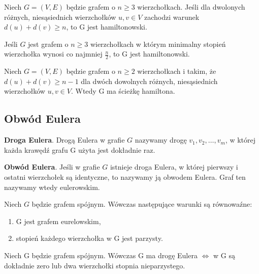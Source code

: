 \documentclass[12pt]{article}
\begin{document}
    \begin{theorem}
        Niech $G = (V, E)$ będzie grafem o $n \geq 3$ wierzchołkach. Jeśli dla dwolonych różnych, niesąsiednich
        wierzchołków $u, v \in V$ zachodzi warunek $d(u) + d(v) \geq n$, to G jest hamiltonowski.
    \end{theorem}

    \begin{theorem}
        Jeśli $G$ jest grafem o $n \geq 3$ wierzchołkach w którym minimalny stopień wierzchołka wynosi co najmniej
        $\frac{n}{2}$, to G jest hamiltonowski.
    \end{theorem}

    \begin{theorem}
        Niech $G = (V, E)$ będzie grafem o $n \geq 2$ wierzchołkach i takim, że $d(u) + d(v) \geq n-1$ dla dwóch dowolnych
        różnych, niesąsiednich wierzchołków $u, v \in V$. Wtedy G ma ścieżkę hamiltona.
    \end{theorem}

    \subsection{Obwód Eulera}
    \begin{definition}
        \textbf{Droga Eulera}. Drogą Eulera w grafie $G$ nazywamy drogę $v_1, v_2, \dots, v_m$, w której każda krawędź grafu G użyta
        jest dokładnie raz.
    \end{definition}
    \begin{definition}
        \textbf{Obwód Eulera}. Jeśli w grafie $G$ istnieje droga Eulera, w której pierwszy i ostatni wierzchołek są identyczne, to nazywamy ją
        obwodem Eulera. Graf ten nazywamy wtedy eulerowskim.
    \end{definition}

    \begin{theorem}
        Niech $G$ będzie grafem spójnym. Wówczas następujące warunki są równowaźne:
        \begin{enumerate}
            \item G jest grafem eurelowskim,
            \item stopień każdego wierzchołka w G jest parzysty.
        \end{enumerate}
    \end{theorem}

    \begin{theorem}
        Niech G będzie grafem spójnym. Wówczas G ma drogę Eulera $\Leftrightarrow$ w G są dokładnie zero lub dwa wierzchołki
        stopnia nieparzystego.
    \end{theorem}
\end{document}
